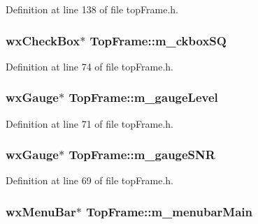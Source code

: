 Definition at line 138 of file top\-Frame.\-h.

\hypertarget{class_top_frame_a29df670ba3a1603316bd0eb5b6b9300c}{
\subsubsection[{m\-\_\-ckbox\-S\-Q}]{\setlength{\rightskip}{0pt plus 5cm}wx\-Check\-Box$\ast$ Top\-Frame\-::m\-\_\-ckbox\-S\-Q\hspace{0.3cm}{\ttfamily [protected]}}}\label{class_top_frame_a29df670ba3a1603316bd0eb5b6b9300c}


Definition at line 74 of file top\-Frame.\-h.

\hypertarget{class_top_frame_a156842bf1e564d3a3bfbf8a17ae1df10}{
\subsubsection[{m\-\_\-gauge\-Level}]{\setlength{\rightskip}{0pt plus 5cm}wx\-Gauge$\ast$ Top\-Frame\-::m\-\_\-gauge\-Level\hspace{0.3cm}{\ttfamily [protected]}}}\label{class_top_frame_a156842bf1e564d3a3bfbf8a17ae1df10}


Definition at line 71 of file top\-Frame.\-h.

\hypertarget{class_top_frame_aff23d43f975a63e1bfeec89f1ef19257}{
\subsubsection[{m\-\_\-gauge\-S\-N\-R}]{\setlength{\rightskip}{0pt plus 5cm}wx\-Gauge$\ast$ Top\-Frame\-::m\-\_\-gauge\-S\-N\-R\hspace{0.3cm}{\ttfamily [protected]}}}\label{class_top_frame_aff23d43f975a63e1bfeec89f1ef19257}


Definition at line 69 of file top\-Frame.\-h.

\hypertarget{class_top_frame_ab8388928329baa6623d0f70f070e6d19}{
\subsubsection[{m\-\_\-menubar\-Main}]{\setlength{\rightskip}{0pt plus 5cm}wx\-Menu\-Bar$\ast$ Top\-Frame\-::m\-\_\-menubar\-Main\hspace{0.3cm}{\ttfamily [protected]}}}\label{class_top_frame_ab8388928329baa6623d0f70f070e6d19}


